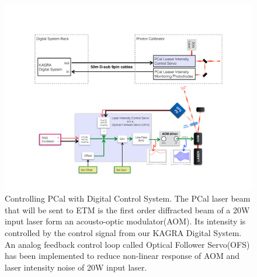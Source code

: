 \begin{figure}[hbt!]
\centering
\includegraphics[width=1\textwidth]{figure/injsigpath}
\caption[Controlling PCal with Digital Control System]{Controlling PCal with Digital Control System. The PCal laser beam that will be sent to ETM is the first order diffracted beam of a 20W input laser form an acousto-optic modulator(AOM). Its intensity is controlled by the control signal from our KAGRA Digital System. An analog feedback control loop called Optical Follower Servo(OFS) has been implemented to reduce non-linear response of AOM and laser intensity noise of 20W input laser.  }
\label{fig:injsigpath}
\end{figure}


%
%
%
%
%
%
%


